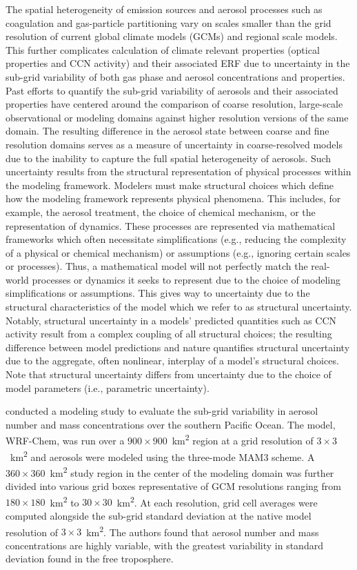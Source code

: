 The spatial heterogeneity of emission sources and aerosol processes such as coagulation and gas-particle partitioning vary on scales smaller than the grid resolution of current global climate models (GCMs) and regional scale models. This further complicates calculation of climate relevant properties  (optical properties and CCN activity) and their associated ERF due to uncertainty in the sub-grid variability of both gas phase and aerosol concentrations and properties. Past efforts to quantify the sub-grid variability of aerosols and their associated properties have centered around the comparison of coarse resolution, large-scale observational or modeling domains against higher resolution versions of the same domain. The resulting difference in the aerosol state between coarse and fine resolution domains serves as a measure of uncertainty in coarse-resolved models due to the inability to capture the full spatial heterogeneity of aerosols. Such uncertainty results from the structural representation of physical processes within the modeling framework. Modelers must make structural choices which define how the modeling framework represents physical phenomena. This includes, for example, the aerosol treatment, the choice of chemical mechanism, or the representation of dynamics. These processes are represented via mathematical frameworks which often necessitate simplifications (e.g., reducing the complexity of a physical or chemical mechanism) or assumptions (e.g., ignoring certain scales or processes). Thus, a mathematical model will not perfectly match the real-world processes or dynamics it seeks to represent due to the choice of modeling simplifications or assumptions. This gives way to uncertainty due to the structural characteristics of the model which we refer to as structural uncertainty. Notably, structural uncertainty in a models’ predicted quantities such as CCN activity result from a complex coupling of all structural choices; the resulting difference between model predictions and nature quantifies structural uncertainty due to the aggregate, often nonlinear, interplay of a model’s structural choices. Note that structural uncertainty differs from uncertainty due to the choice of model parameters (i.e., parametric uncertainty). 

\textcite{lin_quantification_2017} conducted a modeling study to evaluate the sub-grid variability in aerosol number and mass concentrations over the southern Pacific Ocean. The model, WRF-Chem, was run over a $900\times900$~\si{km^2} region at a grid resolution of $3\times3$~\si{km^2} and aerosols were modeled using the three-mode MAM3 scheme. A $360\times360$~\si{km^2} study region in the center of the modeling domain was further divided into various grid boxes representative of GCM resolutions ranging from $180\times180$~\si{km^2} to $30\times30$~\si{km^2}. At each resolution, grid cell averages were computed alongside the sub-grid standard deviation at the native model resolution of $3\times3$~\si{km^2}. The authors found that aerosol number and mass concentrations are highly variable, with the greatest variability in standard deviation found in the free troposphere. 

